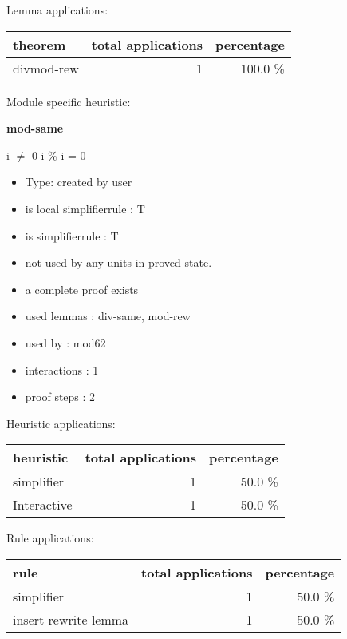 \documentclass[a4paper]{article}
\begin{document}
Lemma applications:

\begin{supertabular}{l|r|r}
theorem	        & total applications & percentage \\ \hline
divmod-rew & 1 & 100.0 \% \\

\end{supertabular}

Module specific heuristic:

\pagebreak

{\LARGE\bf mod-same}\label{lemma-mod-same}

\medskip

i $\neq$ 0 \Fol i \% i = 0

\begin{itemize}

\item Type: created by user

\item is local simplifierrule : T
\item is simplifierrule : T
\item not used by any units in proved state.
\item       a complete proof exists
\item       used lemmas  : div-same, mod-rew
\item       used by      : mod62
\item       interactions : 1
\item       proof steps  : 2
\end{itemize}

\medskip


Heuristic applications:

\begin{supertabular}{l|r|r}
heuristic	& total applications & percentage \\ \hline
simplifier & 1 & 50.0 \% \\
Interactive & 1 & 50.0 \% \\

\end{supertabular}

Rule applications:

\begin{supertabular}{l|r|r}
rule	        & total applications & percentage \\ \hline
simplifier & 1 & 50.0 \% \\
insert rewrite lemma & 1 & 50.0 \% \\

\end{supertabular}
\end{document}
